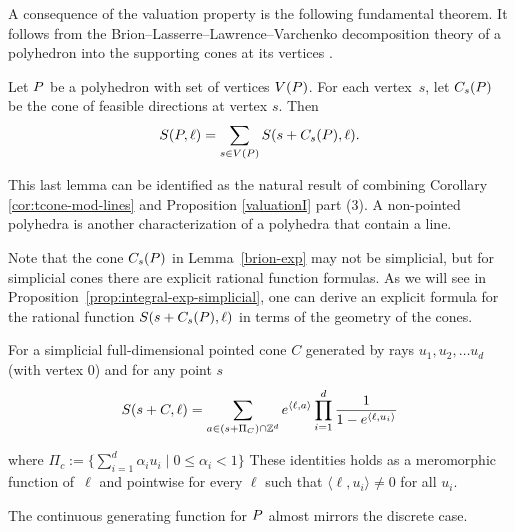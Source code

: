 A consequence of the valuation property is the following fundamental theorem. 
It follows from the Brion--Lasserre--Lawrence--Varchenko decomposition theory of a
polyhedron into the supporting cones at its vertices \cite{beck-haase-sottile:theorema, Brion88,barvinokzurichbook, lasserre-volume1983}.


\begin{lemma} \label{brion-exp} Let ${ P}$ be a polyhedron with set of vertices $V({ P})$. For each
vertex~$s$, let $C_s({ P})$ be the cone of feasible directions at vertex $s$. Then
\begin{equation*}
S({ P},\ell)=\sum_{s\in V({ P})}S(s+C_s({ P}),\ell).
\end{equation*}
\end{lemma}

This last lemma can be identified as the natural result of combining Corollary \ref{cor:tcone-mod-lines} and Proposition \ref{valuationI} part (3). A non-pointed polyhedra is another characterization of  a polyhedra that contain a line.


Note that the cone $C_s({ P})$ in Lemma~\ref{brion-exp} may not be simplicial, but for simplicial cones there are explicit rational function formulas. As we will see in Proposition~\ref{prop:integral-exp-simplicial}, one can derive an explicit formula for 
the rational function $S(s+C_s({ P}),\ell)$ in terms of the geometry of the cones.

\begin{proposition} 
  \label{prop:integral-exp-simplicial}
  For a simplicial full-dimensional pointed cone $C$ generated by rays $u_1,u_2,\dots u_d$ (with vertex $0$) and for any point $s$
\begin{equation*}
S(s+C,\ell)
=\sum_{a \in (s+\Pi_C) \cap {\mathbb Z}^d} e^{\langle \ell, a
  \rangle} \prod_{i=1}^d \frac1{1- e^{\langle \ell, u_i \rangle}}
\end{equation*}

where $\Pi_c := \{ \sum_{i=1}^d \alpha_i u_i \mid 0 \leq \alpha_i < 1\}$
These identities holds as a meromorphic function of~$\ell$ 
and pointwise for every $\ell$ such that $\langle \ell, u_i \rangle \neq 0$ for
all $u_i$.
\end{proposition}

The continuous generating function for ${ P}$ almost mirrors the discrete case. 

